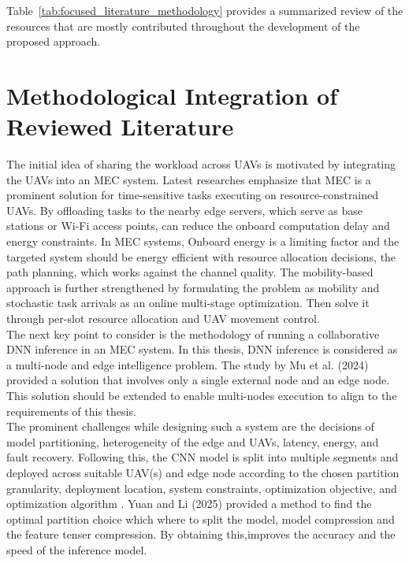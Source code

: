Table~\ref{tab:focused_literature_methodology} provides a summarized review of the resources that are mostly contributed throughout the development of the proposed approach.


\section{Methodological Integration of Reviewed Literature }\label{movement}
The initial idea of sharing the workload across UAVs is motivated by integrating the UAVs into an MEC system. Latest researches emphasize that MEC is a prominent solution for time-sensitive tasks executing on resource-constrained UAVs. By offloading tasks to the nearby edge servers, which serve as base stations or Wi-Fi access points, can reduce the onboard computation delay and energy constraints. In MEC systems, Onboard energy is a limiting factor and the targeted system should be energy efficient with resource allocation decisions, the path planning, which works against the channel quality\cite{EnergyEffUAV}. The mobility-based approach is further strengthened by formulating the problem as mobility and stochastic task arrivals as an online multi-stage optimization. Then solve it through per-slot resource allocation and UAV movement control\cite{DynamicTrajectory2021Yang}.\\

The next key point to consider is the methodology of running a collaborative DNN inference in an MEC system. In this thesis, DNN inference is considered as a multi-node and edge intelligence problem. 
The study by Mu et al. (2024) provided a solution that involves only a single external node and an edge node. This solution should be extended to enable multi-nodes execution to align to the requirements of this thesis.\\

The prominent challenges while designing such a system are the decisions of model partitioning, heterogeneity of the edge and UAVs, latency, energy, and fault recovery. Following this, the CNN model is split into multiple segments and deployed across suitable UAV(s) and edge node according to the chosen partition granularity, deployment location, system constraints, optimization objective, and optimization algorithm \cite{first_ref}\cite{second_ref}. Yuan and Li (2025) provided a method to find the optimal partition choice which where to split the model, model compression and the feature tenser compression. By obtaining this,improves the accuracy and the speed of the inference model.

